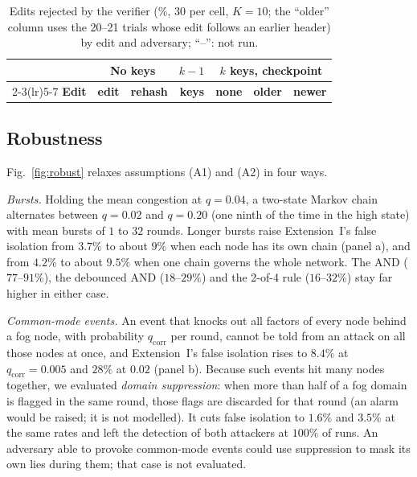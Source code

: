 \begin{table}[!t]
\caption{Edits rejected by the verifier (\%, 30 per cell, $K=10$; the ``older'' column uses the 20--21 trials whose edit follows an earlier header) by edit and adversary; ``--'': not run.}
\label{tab:tamper}
\centering
\renewcommand{\arraystretch}{1.08}
\footnotesize
\setlength{\tabcolsep}{2.2pt}
\begin{tabular}{lrrrrrr}
\toprule
 & \multicolumn{2}{c}{\textbf{No keys}} & \textbf{$k{-}1$} & \multicolumn{3}{c}{\textbf{$k$ keys, checkpoint}} \\
\cmidrule(lr){2-3}\cmidrule(lr){5-7}
\textbf{Edit} & \textbf{edit} & \textbf{rehash} & \textbf{keys} & \textbf{none} & \textbf{older} & \textbf{newer} \\
\midrule
\bottomrule
\end{tabular}
\end{table}

\subsection{Robustness}
\label{sec:res-robust}
Fig.~\ref{fig:robust} relaxes assumptions (A1) and (A2) in four ways.

\emph{Bursts.}  Holding the mean congestion at $q=0.04$, a two-state
Markov chain alternates between $q=0.02$ and $q=0.20$ (one ninth of
the time in the high state) with mean bursts of $1$ to $32$ rounds.
Longer bursts raise Extension~I's false isolation from $3.7\%$ to
about $9\%$ when each node has its own chain (panel a), and from
$4.2\%$ to about $9.5\%$ when one chain governs the whole network.  The AND
($77$--$91\%$), the debounced AND ($18$--$29\%$) and the 2-of-4 rule
($16$--$32\%$) stay far higher in either case.

\emph{Common-mode events.}  An event that knocks out all factors of
every node behind a fog node, with probability $q_{\mathrm{corr}}$ per
round, cannot be told from an attack on all those nodes at once, and
Extension~I's false isolation rises to $8.4\%$ at
$q_{\mathrm{corr}}=0.005$ and $28\%$ at $0.02$ (panel b).  Because such
events hit many nodes together, we evaluated \emph{domain
suppression}: when more than half of a fog domain is flagged in the
same round, those flags are discarded for that round (an alarm would
be raised; it is not modelled).  It cuts
false isolation to $1.6\%$ and $3.5\%$ at the same rates and left the
detection of both attackers at $100\%$ of runs.  An adversary able to provoke
common-mode events could use suppression to mask its own lies during
them; that case is not evaluated.

